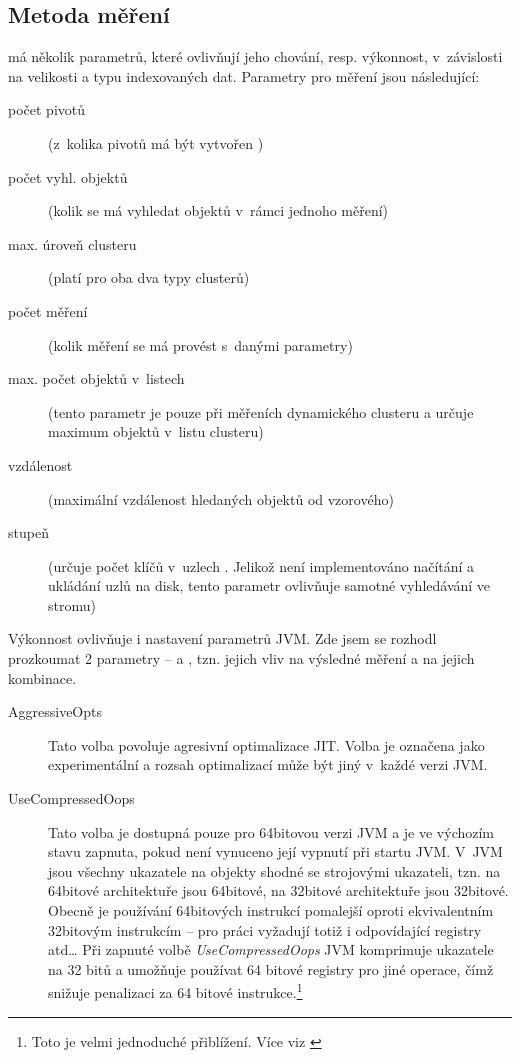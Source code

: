 \subsection{Metoda měření\label{sec:measurementmethod}}

\MIndex{} má několik parametrů, které ovlivňují jeho chování, resp. výkonnost, v~závislosti na velikosti a typu indexovaných dat.
Parametry pro měření jsou následující:
\begin{description}
\item[počet pivotů] (z~kolika pivotů má být vytvořen \MIndex{})
\item[počet vyhl. objektů] (kolik se má vyhledat objektů v~rámci jednoho měření)
\item[max. úroveň clusteru] (platí pro oba dva typy clusterů)
\item[počet měření] (kolik měření se má provést s~danými parametry)
\item[max. počet objektů v~listech] (tento parametr je pouze při měřeních dynamického clusteru a určuje maximum objektů v~listu clusteru)
\item[vzdálenost] (maximální vzdálenost hledaných objektů od vzorového)
\item[stupeň \BPTree{}] (určuje počet klíčů v~uzlech \BPTree{}. Jelikož není implementováno načítání a ukládání uzlů na disk, tento parametr ovlivňuje samotné vyhledávání ve stromu)
\end{description}

Výkonnost  ovlivňuje i nastavení parametrů JVM.
Zde jsem se rozhodl prozkoumat 2 parametry --  a , tzn. jejich vliv na výsledné měření a na jejich kombinace.

\begin{description}
\item[AggressiveOpts] Tato volba povoluje agresivní optimalizace JIT.
Volba je označena jako experimentální a rozsah optimalizací může být jiný v~každé verzi JVM.
\item[UseCompressedOops] Tato volba je dostupná pouze pro 64bitovou verzi JVM a je ve výchozím stavu zapnuta, pokud není vynuceno její vypnutí při startu JVM.
V~JVM jsou všechny ukazatele na objekty shodné se strojovými ukazateli, tzn. na 64bitové architektuře jsou 64bitové, na 32bitové architektuře jsou 32bitové.
Obecně je používání 64bitových instrukcí pomalejší oproti ekvivalentním 32bitovým instrukcím -- pro práci vyžadují totiž i odpovídající registry atd\ldots{}
Při zapnuté volbě \emph{UseCompressedOops} JVM komprimuje ukazatele na 32 bitů a umožňuje používat 64 bitové registry pro jiné operace, čímž snižuje penalizaci za 64 bitové instrukce.\footnote{Toto je velmi jednoduché přiblížení. Více viz \cite{hunt2011java}}
\end{description}


